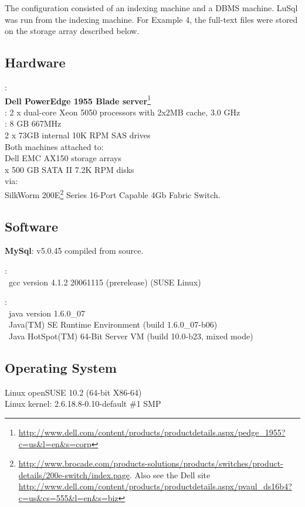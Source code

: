 \label{hardware}

The configuration consisted of an indexing machine and a DBMS machine.
LuSql was run from the indexing machine.
For Example 4, the full-text files were stored on the storage array described
below. 

\subsection{Hardware}
: \\
{\bf Dell PowerEdge 1955 Blade server}\footnote{\url{http://www.dell.com/content/products/productdetails.aspx/pedge_1955?c=us&l=en&s=corp}}\\
: 2 x dual-core Xeon 5050 processors with 2x2MB cache, 3.0 GHz\\
: 8 GB 667MHz\\
 2 x 73GB internal 10K RPM SAS drives\\


\noindent Both machines attached to:\\
\indent Dell EMC AX150 storage arrays\\
 x 500 GB SATA II 7.2K RPM disks\\
via:\\
\indent SilkWorm
200E\footnote{\url{http://www.brocade.com/products-solutions/products/switches/product-details/200e-switch/index.page}.
Also see the Dell site
\url{http://www.dell.com/content/products/productdetails.aspx/pvaul_ds16b4?c=us&cs=555&l=en&s=biz}}
Series 16-Port Capable 4Gb Fabric Switch.

\subsection{Software}
{\bf MySql}: v5.0.45 compiled from source.

: \\
\ gcc version 4.1.2 20061115 (prerelease) (SUSE Linux)

: \\
\ java version 1.6.0\_07\\
\ Java(TM) SE Runtime Environment (build 1.6.0\_07-b06)\\
\ Java HotSpot(TM) 64-Bit Server VM (build 10.0-b23, mixed mode)

\subsection{Operating System}
Linux openSUSE 10.2 (64-bit X86-64)\\
Linux kernel: 2.6.18.8-0.10-default \#1 SMP